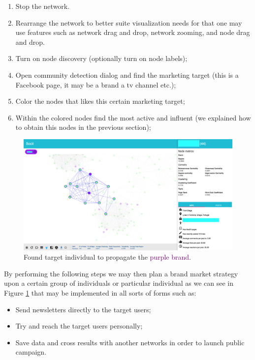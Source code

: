 \begin{enumerate}
    \item Stop the network.
    \item Rearrange the network to better suite visualization needs for that one may use features such as network drag and drop, network zooming, and node drag and drop.
    \item Turn on node discovery (optionally turn on node labels);
    \item Open community detection dialog and find the marketing target (this is a Facebook page, it may be a brand a tv channel etc.);
    \item Color the nodes that likes this certain marketing target;
    \item Within the colored nodes find the most active and influent (we explained how to obtain this nodes in the previous section);
\end{enumerate}

\begin{figure}[h!]
\begin{center}
  \hspace*{-0.8in}
  \includegraphics[width=1.2\textwidth]{img/socii/socii_14.png}
\end{center}
\caption{\label{img:socii_14} Found target individual to propagate the \textcolor{purple}{purple brand}.}
\end{figure}

By performing the following steps we may then plan a brand market strategy upon a certain group of individuals or particular individual as we can see in Figure \ref{img:socii_14} that may be implemented in all sorts of forms such as:
\begin{itemize}
    \item Send newsletters directly to the target users;
    \item Try and reach the target users personally;
    \item Save data and cross results with another networks in order to launch public campaign.
\end{itemize}

